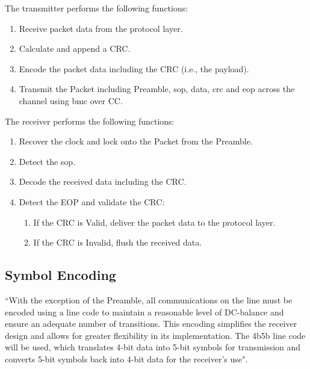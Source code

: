 The transmitter performs the following functions:
\begin{enumerate}
    \item Receive packet data from the protocol layer.
    \item Calculate and append a CRC.
    \item Encode the packet data including the CRC (i.e., the payload).
    \item Transmit the Packet including Preamble, \gls{sop}, data, \gls{crc} and \gls{eop} across the channel using \gls{bmc} over CC.
\end{enumerate}
The receiver performs the following functions: 
\begin{enumerate}
    \item Recover the clock and lock onto the Packet from the Preamble.
    \item Detect the \gls{sop}.
    \item Decode the received data including the CRC.
    \item Detect the EOP and validate the CRC: 
    \begin{enumerate}
        \item If the CRC is Valid, deliver the packet data to the protocol layer.
        \item If the CRC is Invalid, flush the received data.
    \end{enumerate}
\end{enumerate}

\subsection{Symbol Encoding }

“With the exception of the Preamble, all communications on the line must be encoded using a line code to maintain a reasonable level of DC-balance and ensure an adequate number of transitions. This encoding simplifies the receiver design and allows for greater flexibility in its implementation. The 4b5b line code will be used, which translates 4-bit data into 5-bit symbols for transmission and converts 5-bit symbols back into 4-bit data for the receiver’s use"\cite{liu2023transient}.

